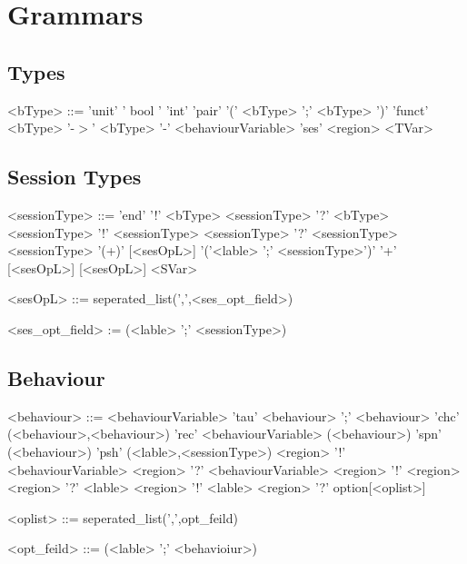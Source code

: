 \documentclass[12pt]{article}
\begin{document}
\section {Grammars}

\subsection{Types}
\begin{grammar}

<bType> ::= 'unit'
\alt ' bool '
\alt 'int'
\alt 'pair' '(' <bType> ';' <bType> ')'
\alt 'funct' <bType> '-$>$' <bType> '-' <behaviourVariable>
\alt 'ses' <region>
\alt <TVar>

\end{grammar}

\subsection{Session Types}

\begin{grammar}

<sessionType> ::= 'end'
\alt '!' <bType> <sessionType>
\alt '?' <bType> <sessionType>
\alt '!' <sessionType> <sessionType>
\alt '?' <sessionType> <sessionType>
\alt '(+)' [<sesOpL>] '('<lable> ';' <sessionType>')'
\alt '+' [<sesOpL>] [<sesOpL>]
\alt <SVar>

<sesOpL> ::= seperated_list(',',<ses_opt_field>)

<ses_opt_field> := (<lable> ';' <sessionType>)

\end{grammar}

\subsection{Behaviour}

\begin{grammar}
<behaviour> ::= <behaviourVariable>
\alt 'tau'
\alt <behaviour> ';' <behaviour>
\alt 'chc' (<behaviour>,<behaviour>)
\alt 'rec' <behaviourVariable> (<behaviour>)
\alt 'spn' (<behaviour>)
\alt 'psh' (<lable>,<sessionType>)
\alt <region> '!' <behaviourVariable>
\alt <region> '?' <behaviourVariable>
\alt <region> '!' <region>
\alt <region> '?' <lable>
\alt <region> '!' <lable>
\alt <region> '?' option[<oplist>]

<oplist> ::= seperated_list(',',opt_feild)

<opt_feild> ::= (<lable> ';' <behavioiur>)

\end{grammar}
\end{document}
